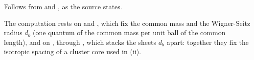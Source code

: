 Follows from  and , as the source states.

The computation rests on  and , which fix the common mass and the Wigner-Seitz radius $d_{b}$ (one quantum of the common mass per unit ball of the common length), and on , through , which stacks the sheets $d_{b}$ apart: together they fix the isotropic spacing of a cluster core used in (ii).
